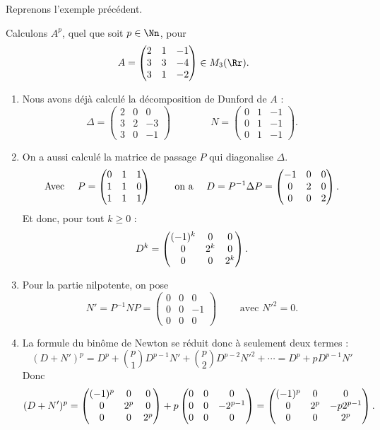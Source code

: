 \documentclass[12pt, class=report,crop=false]{standalone}
\begin{document}
Reprenons l'exemple précédent.

\begin{exemple}
Calculons $A^p$, quel que soit $p\in \Nn$, pour 
$$A=\begin{pmatrix}2&1&-1\cr 3&3&-4\cr 3&1&-2\end{pmatrix} \in M_3(\Rr).$$

\begin{enumerate}
  \item Nous avons déjà calculé la décomposition de Dunford de $A$ :
  $$\Delta = \begin{pmatrix}2 & 0 & 0 \\3 & 2 & -3 \\3 & 0 & -1\end{pmatrix}\qquad \qquad
N = \begin{pmatrix}  0 & 1 & -1 \\0 & 1 & -1 \\0 & 1 & -1\end{pmatrix}.$$
  \item On a aussi calculé la matrice de passage $P$ qui diagonalise $\Delta$.
 $$\text{Avec }\quad P=\begin{pmatrix}0&1&1\cr 1&1&0\cr1&1&1\end{pmatrix} \qquad \text{ on a } \quad
   D = P^{-1}\Delta P = \begin{pmatrix}-1&0&0\cr 0&2&0\cr 0&0&2\end{pmatrix}.$$
   Et donc, pour tout $k\ge0$ :
   $$D^k = \begin{pmatrix}(-1)^k&0&0\cr 0&2^k&0\cr 0&0&2^k\end{pmatrix}.$$
  
  \item Pour la partie nilpotente, on pose
   $$N' = P^{-1}NP = \begin{pmatrix}
   0 & 0 & 0 \\0 & 0 & -1 \\0 & 0 & 0\end{pmatrix} \qquad \text{ avec } N'^2 = 0.$$

\item La formule du binôme de Newton se réduit donc à seulement deux termes :
$$(D+N')^p = D^p + \binom{p}{1} D^{p-1}N' + \binom{p}{2} D^{p-2}N'^2 + \cdots
= D^p + pD^{p-1}N'$$
Donc 
$$(D+N')^p =
 \begin{pmatrix}(-1)^p&0&0\cr 0&2^p&0\cr 0&0&2^p\end{pmatrix}
+p\begin{pmatrix}0&0&0\cr 0&0&-2^{p-1}\cr 0&0&0\end{pmatrix}
= \begin{pmatrix}(-1)^p&0&0\cr 0&2^p&-p2^{p-1}\cr 0&0&2^p\end{pmatrix}.$$


\end{enumerate}
\end{exemple}
\end{document}
